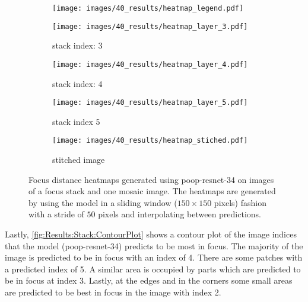 \begin{figure}
    \centering
    \begin{subfigure}[b]{0.75\textwidth}
        \centering
        \texttt{[image: images/40\_results/heatmap\_legend.pdf]}
    \end{subfigure}
    \begin{subfigure}[b]{0.45\textwidth}
        \centering
        \texttt{[image: images/40\_results/heatmap\_layer\_3.pdf]}
        \caption{stack index: 3}
        \label{fig:Results:Stack:HeatMap:Stack3}
        \vspace{1em}
    \end{subfigure}%
    \begin{subfigure}[b]{0.45\textwidth}
        \centering
        \texttt{[image: images/40\_results/heatmap\_layer\_4.pdf]}
        \caption{stack index: 4}
        \label{fig:Results:Stack:HeatMap:Stack4}
        \vspace{1em}
    \end{subfigure}
    \par
    \begin{subfigure}[b]{0.45\textwidth}
        \centering
        \texttt{[image: images/40\_results/heatmap\_layer\_5.pdf]}
        \caption{stack index 5}
        \label{fig:Results:Stack:HeatMap:Stack5}
    \end{subfigure}%
    \begin{subfigure}[b]{0.45\textwidth}
        \centering
        \texttt{[image: images/40\_results/heatmap\_stiched.pdf]}
        \caption{stitched image}
        \label{fig:Results:Stack:HeatMap:Stiched}
    \end{subfigure}
    \caption[Focus distance heatmaps]{Focus distance heatmaps generated using \acs{poop}-\acs{resnet}-34 on images of a focus stack and one mosaic image. The heatmaps are generated by using the model in a sliding window ($150 \times 150$ pixels) fashion with a stride of $50$ pixels and interpolating between predictions.}
    \label{fig:Results:Stack:HeatMap}
\end{figure}

Lastly, \autoref{fig:Results:Stack:ContourPlot} shows a contour plot of the image indices that the model (\acs{poop}-\acs{resnet}-34) predicts to be most in focus. The majority of the image is predicted to be in focus with an index of 4. There are some patches with a predicted index of 5. A similar area is occupied by parts which are predicted to be in focus at index 3. Lastly, at the edges and in the corners some small areas are predicted to be best in focus in the image with index 2. 

